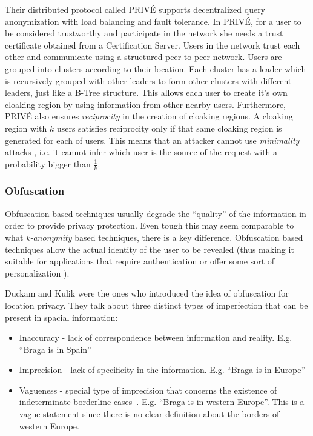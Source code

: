 Their distributed protocol called PRIVÉ supports decentralized query
anonymization with load balancing and fault tolerance. In PRIVÉ, for a
user to be considered trustworthy and participate in the network she
needs a trust certificate obtained from a Certification Server. Users
in the network trust each other and communicate using a structured
peer-to-peer network. Users are grouped into clusters according to
their location. Each cluster has a leader which is recursively grouped
with other leaders to form other clusters with different leaders, just
like a B-Tree structure. This allows each user to create it's own
cloaking region by using information from other nearby users.
Furthermore, PRIVÉ also ensures \emph{reciprocity} in the creation of
cloaking regions. A cloaking region with $k$ users satisfies
reciprocity only if that same cloaking region is generated for each of
users. This means that an attacker cannot use \emph{minimality} attacks
\cite{wong2007minimality}, i.e. it cannot infer which user is the
source of the request with a probability bigger than $\frac{1}{k}$.

\subsubsection{Obfuscation}
\label{sec:Obfuscation}

Obfuscation based techniques usually degrade the ``quality'' of the
information in order to provide privacy protection. Even tough this may
seem comparable to what \emph{k-anonymity} based techniques, there is a
key difference. Obfuscation based techniques allow the actual identity
of the user to be revealed (thus making it suitable for applications
that require authentication or offer some sort of  personalization
\cite{langheinrich2001privacy}).

Duckam and Kulik
\cite{duckham2005formal} were the ones who introduced the idea of
obfuscation for location privacy. They talk about three distinct types of
imperfection that can be present in spacial information:
\begin{itemize}
\item Inaccuracy - lack of correspondence between information and
  reality. E.g. ``Braga is in Spain''
\item Imprecision - lack of specificity in the information. E.g.
  ``Braga is in Europe''
\item Vagueness - special type of imprecision that concerns the
  existence of indeterminate borderline
  cases~\cite{duckham2001formal}. E.g. ``Braga is in western Europe''.
  This is a vague statement since there is no clear definition about
  the borders of western Europe.
\end{itemize}

